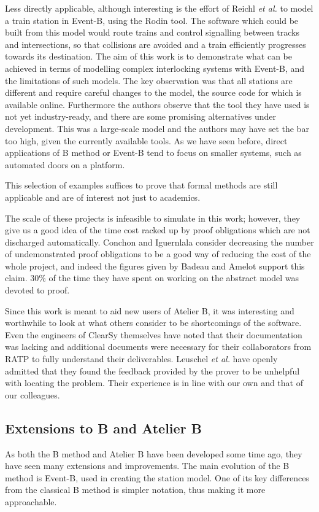 \documentclass[12pt,journal,duplex]{IEEEtran}
\begin{document}
	Less directly applicable, although interesting is the effort of Reichl \textit{et al.} to model a train station in Event-B, using the Rodin tool\cite{station model}. The software which could be built from this model would route trains and control signalling between tracks and intersections, so that collisions are avoided and a train efficiently progresses towards its destination. The aim of this work is to demonstrate what can be achieved in terms of modelling complex interlocking systems with Event-B, and the limitations of such models. The key observation was that all stations are different and require careful changes to the model, the source code for which is available online. Furthermore the authors observe that the tool they have used is not yet industry-ready, and there are some promising alternatives under development. This was a large-scale model and the authors may have set the bar too high, given the currently available tools. As we have seen before, direct applications of B method or Event-B tend to focus on smaller systems, such as automated doors on a platform.

	This selection of examples suffices to prove that formal methods are still applicable and are of interest not just to academics.

	The scale of these projects is infeasible to simulate in this work; however, they give us a good idea of the time cost racked up by proof obligations which are not discharged automatically. Conchon and Iguernlala consider decreasing the number of undemonstrated proof obligations to be a good way of reducing the cost of the whole project\cite{survey}, and indeed the figures given by Badeau and Amelot support this claim. 30\% of the time they have spent on working on the abstract model was devoted to proof\cite{airport shuttle}.

	Since this work is meant to aid new users of Atelier B, it was interesting and worthwhile to look at what others consider to be shortcomings of the software. Even the engineers of ClearSy themselves have noted that their documentation was lacking and additional documents were necessary for their collaborators from RATP to fully understand their deliverables\cite{screen doors}. Leuschel \emph{et al.} have openly admitted that they found the feedback provided by the prover to be unhelpful with locating the problem\cite{San Juan metro}. Their experience is in line with our own and that of our colleagues.

	\subsection{Extensions to B and Atelier B}
	As both the B method and Atelier B have been developed some time ago, they have seen many extensions and improvements. The main evolution of the B method is Event-B, used in creating the station model. One of its key differences from the classical B method is simpler notation, thus making it more approachable.\cite{event-b}
\end{document}
